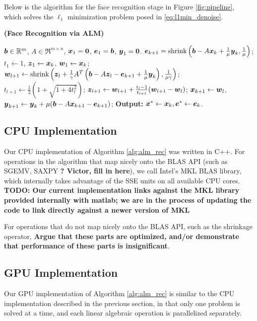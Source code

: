 \documentclass[10pt,twocolumn,letterpaper]{article}
\begin{document}
Below is the algorithm for the face recognition stage in Figure \ref{fig:pipeline}, which
solves the $\ell_1$ minimization problem posed in \eqref{eq:l1min_denoise}. 

\begin{algorithm}[t]
\caption{\bf (Face Recognition via ALM)}
\begin{algorithmic}[1]
\begin{small}
 ${\boldsymbol{b}} \in {\mathbb{R}}^m$, $A \in \Re^{m \times n}$,
${\boldsymbol{x}}_1 = \boldsymbol{0}$, $\boldsymbol{e}_1 = {\boldsymbol{b}}$, $\boldsymbol{y}_1 =
\boldsymbol{0}$.
\STATE $\boldsymbol{e}_{k+1} = \textup{shrink}\left({\boldsymbol{b}} - A{\boldsymbol{x}}_k +
\frac{1}{\mu}\boldsymbol{y}_k, \frac{1}{\mu}\right)$;
\STATE $t_1\leftarrow 1$, $\boldsymbol{z}_1 \leftarrow {\boldsymbol{x}}_k$, $\boldsymbol{w}_1 \leftarrow {\boldsymbol{x}}_k$;
\STATE $\boldsymbol{w}_{l+1} \leftarrow \textup{shrink}\left(\boldsymbol{z}_l +
\frac{1}{\gamma}A^T\left({\boldsymbol{b}} - A\boldsymbol{z}_l - \boldsymbol{e}_{k+1} +
\frac{1}{\mu}\boldsymbol{y}_k\right), \frac{1}{\mu\gamma}\right)$;
\STATE $t_{l+1} \leftarrow \frac{1}{2}\left( 1 +
\sqrt{1+4t_l^2}\right)$;
\STATE $\boldsymbol{z}_{l+1} \leftarrow \boldsymbol{w}_{l+1} + \frac{t_l - 1}{t_{l+1}}(\boldsymbol{w}_{l+1} - \boldsymbol{w}_l)$;
\ENDWHILE
\STATE ${\boldsymbol{x}}_{k+1} \leftarrow \boldsymbol{w}_{l}$,  \; $\boldsymbol{y}_{k+1} \leftarrow \boldsymbol{y}_k + \mu ({\boldsymbol{b}} - A{\boldsymbol{x}}_{k+1} - \boldsymbol{e}_{k+1})$;
\ENDWHILE \STATE
{\bf Output:} ${\boldsymbol{x}}^* \leftarrow {\boldsymbol{x}}_k, \boldsymbol{e}^* \leftarrow \boldsymbol{e}_k$.
\end{small}
\end{algorithmic}
\label{alg:alm_rec} 
\end{algorithm}

\subsection{CPU Implementation} Our CPU implementation of Algorithm
\ref{alg:alm_rec} was written in C++.  For operations in the algorithm that map
nicely onto the BLAS API (such as SGEMV, SAXPY {\bf? Victor, fill in here}), we
call Intel's MKL BLAS library, which internally takes advantage of the SSE
units on all available CPU cores. 
{\bf TODO: Our current implementation links against the MKL
library provided internally with matlab; we are in the process of updating the code to link directly against a newer version
of MKL}  

For operations that do not map nicely onto the BLAS API, such as the shrinkage
operator, {\bf Argue that these parts are optimized, and/or demonstrate that
performance of these parts is insignificant}.

\subsection{GPU Implementation} Our GPU implementation of Algorithm
\ref{alg:alm_rec} is similar to the CPU implementation described in the
previous section, in that only one problem is solved at a time, and each linear
algebraic operation is parallelized separately.
\end{document}
